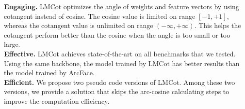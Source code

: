 \noindent \textbf{Engaging.} LMCot optimizes the angle of weights and feature vectors by using cotangent instead of cosine. The cosine value is limited on range $\left[ -1 ,+1  \right]$, whereas the cotangent value is unlimited on range $\left( -\infty ,+\infty  \right)$.  This helps the cotangent perform better than the cosine when the angle is too small or too large.\\
\textbf{Effective.} LMCot achieves state-of-the-art on all benchmarks that we tested. Using the same backbone, the model trained by LMCot has better results than the model trained by ArcFace.\\
\textbf{Efficient.} We propose two pseudo code versions of LMCot. Among these two versions, we provide a solution that skips the arc-cosine calculating steps to improve the computation efficiency.